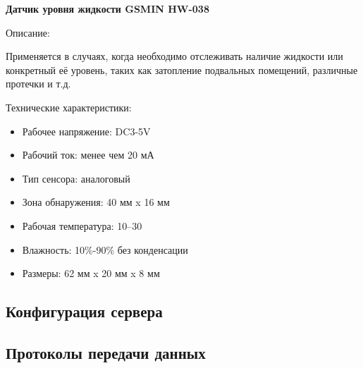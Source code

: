 \newpage
\textbf{Датчик уровня жидкости GSMIN HW-038}

Описание:

Применяется в случаях, когда необходимо отслеживать наличие жидкости или конкретный её уровень, таких как затопление подвальных помещений, различные протечки и т.д.

Технические характеристики:
\begin{itemize}
    \item Рабочее напряжение: DC3-5V
    \item Рабочий ток: менее чем 20 мА
    \item Тип сенсора: аналоговый
    \item Зона обнаружения: 40 мм x 16 мм
    \item Рабочая температура: 10--30
    \item Влажность: 10\%-90\% без конденсации
    \item Размеры: 62 мм x 20 мм x 8 мм
\end{itemize}






\subsection{Конфигурация сервера}


\subsection{Протоколы передачи данных}

